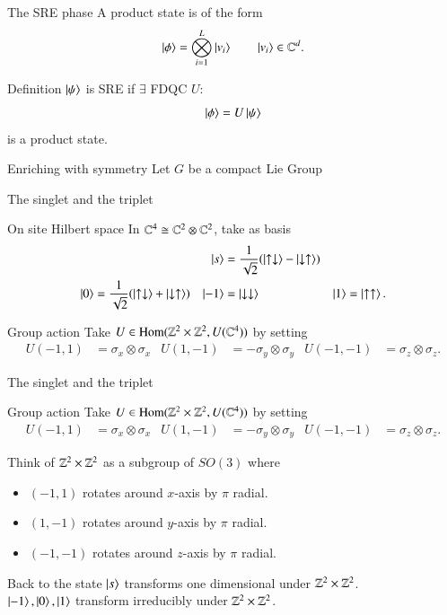 \documentclass{beamer}
\begin{document}
\begin{frame}{The SRE phase}
	A product state is of the form
	\[\ket{\phi}=\bigotimes_{i=1}^L\ket{v_i}\qquad \ket{v_i}\in\mathbb{C}^d.\]
	\pause
	\begin{block}{Definition}
		$\ket{\psi}$ is SRE if $\exists$ FDQC $U$:
		\[\ket{\phi}=U\ket{\psi}\]
		is a product state.
	\end{block}
\end{frame}

\begin{frame}{Enriching with symmetry}
	Let $G$ be a compact Lie Group
\end{frame}

\begin{frame}{The singlet and the triplet}
	\begin{block}{On site Hilbert space}
		In $\mathbb{C}^4\cong \mathbb{C}^2\otimes \mathbb{C}^2$, take as basis
		\begin{align*}
			&&\ket{s}&=\frac{1}{\sqrt{2}}(\ket{\uparrow\downarrow}-\ket{\downarrow\uparrow})&&\\
			\ket{0}&=\frac{1}{\sqrt{2}}(\ket{\uparrow\downarrow}+\ket{\downarrow\uparrow})&\ket{-1}&=\ket{\downarrow\downarrow}&\ket{1}&=\ket{\uparrow\uparrow}.
		\end{align*}
	\end{block}
	\pause
	\begin{block}{Group action}
		Take $U\in \textrm{Hom}(\mathbb{Z}^2\times \mathbb{Z}^2,U(\mathbb{C}^4))$ by setting
		\begin{align*}
		U(-1,1)&=\sigma_x\otimes \sigma_x&U(1,-1)&=-\sigma_y\otimes \sigma_y&U(-1,-1)&=\sigma_z\otimes \sigma_z.
		\end{align*}
	\end{block}
\end{frame}

\begin{frame}{The singlet and the triplet}
	\begin{block}{Group action}
		Take $U\in \textrm{Hom}(\mathbb{Z}^2\times \mathbb{Z}^2,U(\mathbb{C}^4))$ by setting
		\begin{align*}
		U(-1,1)&=\sigma_x\otimes \sigma_x&U(1,-1)&=-\sigma_y\otimes \sigma_y&U(-1,-1)&=\sigma_z\otimes \sigma_z.
		\end{align*}
	\end{block}
	Think of $\mathbb{Z}^2\times \mathbb{Z}^2$ as a subgroup of $SO(3)$ where
	\begin{itemize}
		\item $(-1,1)$ rotates around $x$-axis by $\pi$ radial.
		\item $(1,-1)$ rotates around $y$-axis by $\pi$ radial.
		\item $(-1,-1)$ rotates around $z$-axis by $\pi$ radial.
	\end{itemize}
	\pause
	\begin{block}{Back to the state}
		$\ket{s}$ transforms one dimensional under $\mathbb{Z}^2\times \mathbb{Z}^2$.\\
		$\ket{-1},\ket{0},\ket{1}$ transform irreducibly under $\mathbb{Z}^2\times \mathbb{Z}^2$.
	\end{block}
\end{frame}
\end{document}
